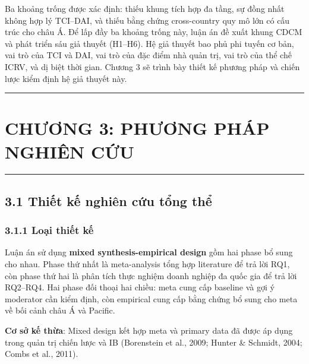 \documentclass[12pt,a4paper]{article}
\begin{document}
Ba khoảng trống được xác định: thiếu khung tích hợp đa tầng, sự đồng
nhất không hợp lý TCI--DAI, và thiếu bằng chứng cross-country quy mô lớn
có cấu trúc cho châu Á. Để lấp đầy ba khoảng trống này, luận án đề xuất
khung CDCM và phát triển sáu giả thuyết (H1--H6). Hệ giả thuyết bao phủ
phi tuyến cơ bản, vai trò của TCI và DAI, vai trò của đặc điểm nhà quản
trị, vai trò của thể chế ICRV, và dị biệt thời gian. Chương 3 sẽ trình
bày thiết kế phương pháp và chiến lược kiểm định hệ giả thuyết này.

\begin{center}\rule{0.5\linewidth}{0.5pt}\end{center}

\hypertarget{chux1b0ux1a1ng-3-phux1b0ux1a1ng-phuxe1p-nghiuxean-cux1ee9u}{%
\section{CHƯƠNG 3: PHƯƠNG PHÁP NGHIÊN
CỨU}\label{chux1b0ux1a1ng-3-phux1b0ux1a1ng-phuxe1p-nghiuxean-cux1ee9u}}

\begin{center}\rule{0.5\linewidth}{0.5pt}\end{center}

\hypertarget{31-thiux1ebft-kux1ebf-nghiuxean-cux1ee9u-tux1ed5ng-thux1ec3}{%
\subsection{3.1 Thiết kế nghiên cứu tổng
thể}\label{31-thiux1ebft-kux1ebf-nghiuxean-cux1ee9u-tux1ed5ng-thux1ec3}}

\hypertarget{311-loux1ea1i-thiux1ebft-kux1ebf}{%
\subsubsection{3.1.1 Loại thiết
kế}\label{311-loux1ea1i-thiux1ebft-kux1ebf}}

Luận án sử dụng \textbf{mixed synthesis-empirical design} gồm hai phase
bổ sung cho nhau. Phase thứ nhất là meta-analysis tổng hợp literature để
trả lời RQ1, còn phase thứ hai là phân tích thực nghiệm doanh nghiệp đa
quốc gia để trả lời RQ2--RQ4. Hai phase đối thoại hai chiều: meta cung
cấp baseline và gợi ý moderator cần kiểm định, còn empirical cung cấp
bằng chứng bổ sung cho meta về bối cảnh châu Á và Pacific.

\textbf{Cơ sở kế thừa}: Mixed design kết hợp meta và primary data đã
được áp dụng trong quản trị chiến lược và IB (Borenstein et al., 2009;
Hunter \& Schmidt, 2004; Combs et al., 2011).
\end{document}
